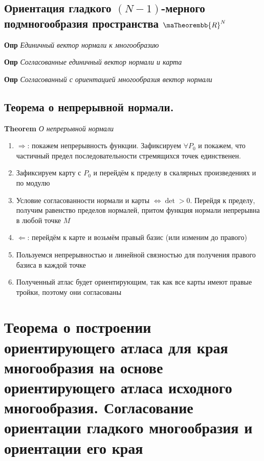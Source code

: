 \documentclass[a4paper, 14pt]{article}
\begin{document}
    \subsection{Ориентация гладкого $(N - 1)$-мерного подмногообразия пространства $\maTheorembb{R}^N$}
    
    \textbf{Опр} \textit{Единичный вектор нормали к многообразию}
    
    \textbf{Опр} \textit{Согласованные единичный вектор нормали и карта}
    
    \textbf{Опр} \textit{Согласованный с ориентацией многообразия вектор нормали}
    
    \subsection{Теорема о непрерывной нормали.}
    
    \textbf{Theorem} \textit{О непрерывной нормали}
    
    \begin{enumerate}
        \item $\Rightarrow$: покажем непрерывность функции.
        Зафиксируем $\forall P_0$ и покажем, что частичный предел последовательности стремящихся точек единственен.
        \item Зафиксируем карту с $P_0$ и перейдём к пределу в скалярных произведениях и по модулю
        \item Условие согласованности нормали и карты $\Leftrightarrow \det > 0$.
        Перейдя к пределу, получим равенство пределов нормалей, притом функция нормали непрерывна в любой точке $M$
        \item $\Leftarrow$: перейдём к карте и возьмём правый базис (или изменим до правого)
        \item Пользуемся непрерывностью и линейной связностью для получения правого базиса в каждой точке
        \item Полученный атлас будет ориентирующим, так как все карты имеют правые тройки, поэтому они согласованы
    \end{enumerate}
    
    \section{Теорема о построении ориентирующего атласа для края многообразия на основе ориентирующего атласа
    исходного многообразия.
    Согласование ориентации гладкого многообразия и ориентации его края}
    
\end{document}
